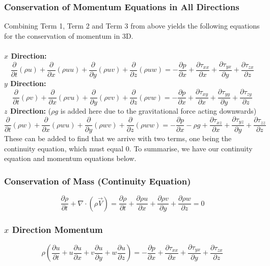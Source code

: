 \subsubsection{Conservation of Momentum Equations in All Directions}
Combining Term 1, Term 2 and Term 3 from above yields the following equations for the conservation of momentum in 3D. \\\\
\textbf{$x$ Direction:}
\begin{equation}
  \frac{\partial}{\partial t} (\rho u ) + \frac{\partial}{\partial x} (\rho uu) + \frac{\partial}{\partial y} (\rho uv) + \frac{\partial}{\partial z} (\rho uw) = -\frac{\partial p}{\partial x} + \frac{\partial \tau_{xx}}{\partial x} + \frac{\partial \tau_{yx}}{\partial y} + \frac{\partial \tau_{zx}}{\partial z}
\end{equation}
\textbf{$y$ Direction:}
\begin{equation}
  \frac{\partial}{\partial t} (\rho v ) + \frac{\partial}{\partial x} (\rho vu) + \frac{\partial}{\partial y} (\rho vv) + \frac{\partial}{\partial z} (\rho vw) = -\frac{\partial p}{\partial x} + \frac{\partial \tau_{xy}}{\partial x} + \frac{\partial \tau_{yy}}{\partial y} + \frac{\partial \tau_{zy}}{\partial z}
\end{equation}
\textbf{$z$ Direction:} ($\rho g$ is added here due to the gravitational force acting downwards)
\begin{equation}
  \frac{\partial}{\partial t} (\rho w ) + \frac{\partial}{\partial x} (\rho wu) + \frac{\partial}{\partial y} (\rho wv) + \frac{\partial}{\partial z} (\rho ww) = -\frac{\partial p}{\partial x} - \rho g + \frac{\partial \tau_{xz}}{\partial x} + \frac{\partial \tau_{yz}}{\partial y} + \frac{\partial \tau_{zz}}{\partial z}
\end{equation}
These can be added to find that we arrive with two terms, one being the continuity equation, which must equal 0. To summarise, we have our continuity equation and momentum equations below.
\subsubsection{Conservation of Mass (Continuity Equation)}
\begin{equation}
  \frac{\partial \rho}{\partial t} + \nabla \cdot (\rho \vec{V}) = \frac{\partial \rho}{\partial t} + \frac{\partial \rho u}{\partial x} + \frac{\partial \rho v}{\partial y} + \frac{\partial \rho w}{\partial z} = 0
\end{equation}
\subsubsection{$x$ Direction Momentum}
\begin{equation}
  \rho \left( \frac{\partial u}{\partial t} + u \frac{\partial u}{\partial x} + v \frac{\partial u}{\partial y} + w \frac{\partial u}{\partial z} \right) = -\frac{\partial p}{\partial x} + \frac{\partial \tau_{xx}}{\partial x} + \frac{\partial \tau_{yx}}{\partial y} + \frac{\partial \tau_{zx}}{\partial z}
\end{equation}
